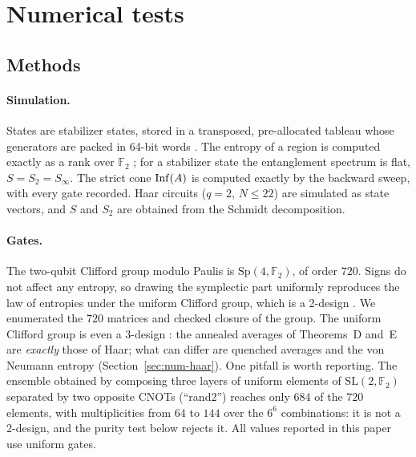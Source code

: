 \section{Numerical tests}\label{sec:num}

\subsection{Methods}\label{sec:num-methods}

\paragraph{Simulation.} States are stabilizer states, stored in a transposed, pre-allocated tableau whose generators are packed in 64-bit words \cite{AaronsonGottesman2004}. The entropy of a region is computed exactly as a rank over $\mathbb F_2$ \cite{Fattal2004}; for a stabilizer state the entanglement spectrum is flat, $S=S_2=S_\infty$. The strict cone $\mathrm{Inf}(A)$ is computed exactly by the backward sweep, with every gate recorded. Haar circuits ($q=2$, $N\le22$) are simulated as state vectors, and $S$ and $S_2$ are obtained from the Schmidt decomposition.

\paragraph{Gates.} The two-qubit Clifford group modulo Paulis is $\mathrm{Sp}(4,\mathbb F_2)$, of order $720$. Signs do not affect any entropy, so drawing the symplectic part uniformly reproduces the law of entropies under the uniform Clifford group, which is a 2-design \cite{DLT2002,Webb2016,Zhu2017}. We enumerated the $720$ matrices and checked closure of the group. The uniform Clifford group is even a 3-design \cite{Webb2016,Zhu2017}: the annealed averages of Theorems~D and~E are \emph{exactly} those of Haar; what can differ are quenched averages and the von Neumann entropy (Section~\ref{sec:num-haar}). One pitfall is worth reporting. The ensemble obtained by composing three layers of uniform elements of $\mathrm{SL}(2,\mathbb F_2)$ separated by two opposite CNOTs (``rand2'') reaches only $684$ of the $720$ elements, with multiplicities from $64$ to $144$ over the $6^6$ combinations: it is not a 2-design, and the purity test below rejects it. All values reported in this paper use uniform gates.

